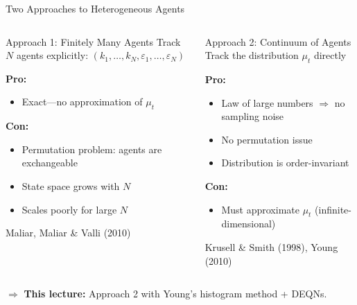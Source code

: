 \documentclass[aspectratio=169,11pt]{beamer}
\newcommand{\emphc}[1]{\textcolor{harvardcrimson}{#1}}
\begin{document}
\begin{frame}{Two Approaches to Heterogeneous Agents}
\footnotesize
\begin{columns}[T]
\begin{block}{Approach 1: Finitely Many Agents}
Track $N$ agents explicitly: $(k_1, \ldots, k_N, \varepsilon_1, \ldots, \varepsilon_N)$

\vspace{0.2em}
\textbf{Pro:}
\begin{itemize}\itemsep0pt
    \item Exact---no approximation of $\mu_t$
\end{itemize}

\textbf{Con:}
\begin{itemize}\itemsep0pt
    \item \emphc{Permutation problem}: agents are exchangeable
    \item State space grows with $N$
    \item Scales poorly for large $N$
\end{itemize}

{\scriptsize Maliar, Maliar \& Valli (2010)}
\end{block}

\begin{block}{Approach 2: Continuum of Agents}
Track the \emphc{distribution} $\mu_t$ directly

\vspace{0.2em}
\textbf{Pro:}
\begin{itemize}\itemsep0pt
    \item Law of large numbers $\Rightarrow$ no sampling noise
    \item No permutation issue
    \item Distribution is order-invariant
\end{itemize}

\textbf{Con:}
\begin{itemize}\itemsep0pt
    \item Must approximate $\mu_t$ (infinite-dimensional)
\end{itemize}

{\scriptsize Krusell \& Smith (1998), Young (2010)}
\end{block}
\end{columns}

\vspace{0.05em}
\begin{center}
{\footnotesize $\Rightarrow$ \textbf{This lecture:} Approach 2 with Young's histogram method + DEQNs.}
\end{center}
\end{frame}
\end{document}
